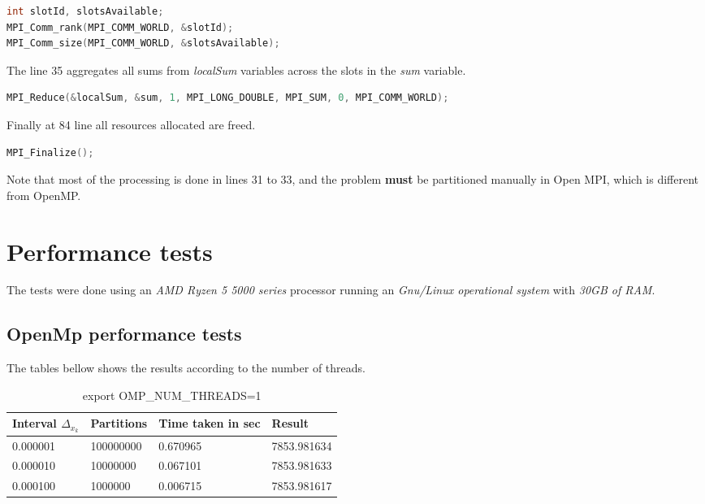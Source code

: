 	\begin{lstlisting}[language=C++]
int slotId, slotsAvailable;
MPI_Comm_rank(MPI_COMM_WORLD, &slotId);
MPI_Comm_size(MPI_COMM_WORLD, &slotsAvailable);
	\end{lstlisting}

	\par The line 35 aggregates all sums from \textit{localSum} variables across the slots in the \textit{sum} variable.
	
	\begin{lstlisting}[language=C++]
MPI_Reduce(&localSum, &sum, 1, MPI_LONG_DOUBLE, MPI_SUM, 0, MPI_COMM_WORLD);
	\end{lstlisting}

	\par Finally at 84 line all resources allocated are freed.
	\begin{lstlisting}[language=C++]
MPI_Finalize();
	\end{lstlisting}

	\par Note that most of the processing is done in lines 31 to 33, and the problem \textbf{must} be partitioned manually in Open MPI, which is different from OpenMP. 

	\section{Performance tests}
		\par The tests were done using an \textit{AMD Ryzen 5 5000 series} processor running an \textit{Gnu/Linux operational system} with \textit{30GB of RAM}.\newline
		
		\subsection{OpenMp performance tests}
		
		\par The tables bellow shows the results according to the number of threads. 
		
		\begin{table}[h]
			\caption{export OMP\_NUM\_THREADS=1}
			\begin{center}
				\begin{tabular}{|l|l|l|l|}
					\hline
					Interval $\Delta_{x_k}$  &  Partitions  &  Time taken in sec &  Result \\
					\hline
					0.000001  &  100000000  &  0.670965  &  7853.981634 \\
					\hline
					0.000010  &  10000000  &  0.067101  &  7853.981633 \\
					\hline
					0.000100  &  1000000  &  0.006715  &  7853.981617 \\
					\hline
				\end{tabular}
			\end{center}
		\end{table}
		
